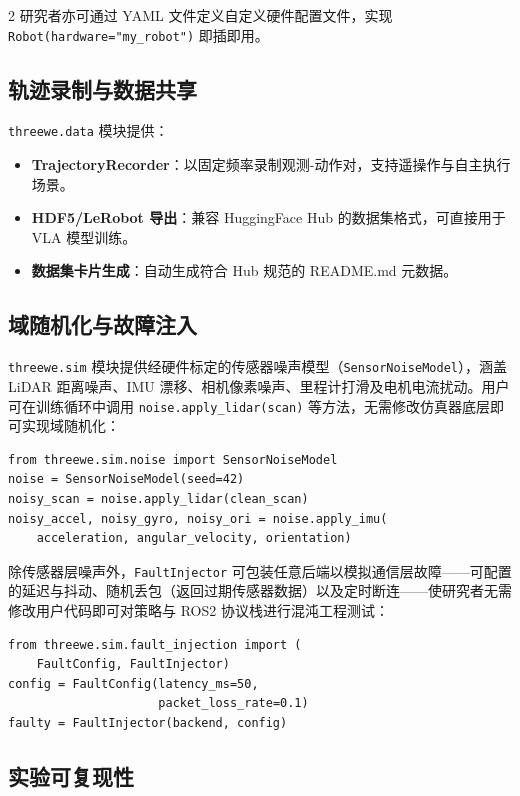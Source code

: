 \documentclass[UTF8]{ctexart}
\begin{document}
\begin{multicols}{2}
研究者亦可通过 YAML 文件定义自定义硬件配置文件，实现\texttt{Robot(hardware="my\_robot")} 即插即用。

\subsection{轨迹录制与数据共享}

\texttt{threewe.data} 模块提供：
\begin{itemize}
    \item \textbf{TrajectoryRecorder}：以固定频率录制观测-动作对，支持遥操作与自主执行场景。
    \item \textbf{HDF5/LeRobot 导出}：兼容 HuggingFace Hub 的数据集格式，可直接用于 VLA 模型训练。
    \item \textbf{数据集卡片生成}：自动生成符合 Hub 规范的 README.md 元数据。
\end{itemize}

\subsection{域随机化与故障注入}

\texttt{threewe.sim} 模块提供经硬件标定的传感器噪声模型（\texttt{SensorNoiseModel}），涵盖 LiDAR 距离噪声、IMU 漂移、相机像素噪声、里程计打滑及电机电流扰动。用户可在训练循环中调用 \texttt{noise.apply\_lidar(scan)} 等方法，无需修改仿真器底层即可实现域随机化：

\begin{lstlisting}
from threewe.sim.noise import SensorNoiseModel
noise = SensorNoiseModel(seed=42)
noisy_scan = noise.apply_lidar(clean_scan)
noisy_accel, noisy_gyro, noisy_ori = noise.apply_imu(
    acceleration, angular_velocity, orientation)
\end{lstlisting}

除传感器层噪声外，\texttt{FaultInjector} 可包装任意后端以模拟通信层故障——可配置的延迟与抖动、随机丢包（返回过期传感器数据）以及定时断连——使研究者无需修改用户代码即可对策略与 ROS2 协议栈进行混沌工程测试：

\begin{lstlisting}
from threewe.sim.fault_injection import (
    FaultConfig, FaultInjector)
config = FaultConfig(latency_ms=50,
                     packet_loss_rate=0.1)
faulty = FaultInjector(backend, config)
\end{lstlisting}

\subsection{实验可复现性}


\end{multicols}
\end{document}
